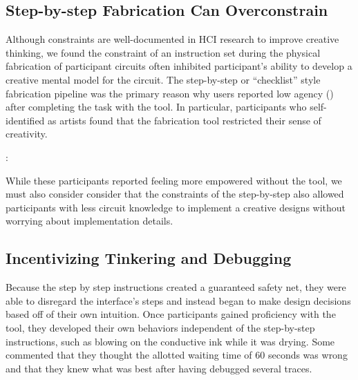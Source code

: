 \documentclass{sigchi}
\begin{document}
  \subsection{Step-by-step Fabrication Can Overconstrain}
  Although constraints are well-documented in HCI research to improve creative thinking, we found the constraint of an instruction set during the physical fabrication of participant circuits often inhibited participant's ability to develop a creative mental model for the circuit. The step-by-step or ``checklist'' style fabrication pipeline was the primary reason why users reported low agency () after completing the task with the tool. In particular, participants who self-identified as artists found that the fabrication tool restricted their sense of creativity.
  \begin{myquote}
   \vspace{-2pt}
    :
    \vspace{-2pt}
  \end{myquote}
  While these participants reported feeling more empowered without the tool, we must also consider consider that the constraints of the step-by-step also allowed participants with less circuit knowledge to implement a creative designs without worrying about implementation details.
  
  \subsection{Incentivizing Tinkering and Debugging}
  Because the step by step instructions created a guaranteed safety net, they were able to disregard the interface's steps and instead began to make design decisions based off of their own intuition. Once participants gained proficiency with the tool, they developed their own behaviors independent of the step-by-step instructions, such as blowing on the conductive ink while it was drying. Some commented that they thought the allotted waiting time of 60 seconds was wrong and that they knew what was best after having debugged several traces.
  
\end{document}
